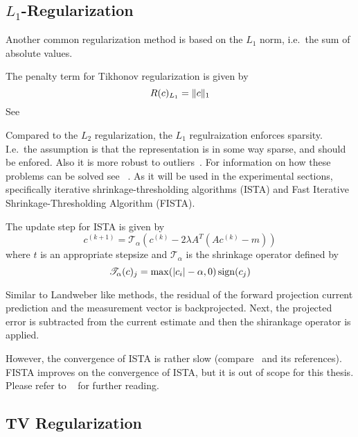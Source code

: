 \subsection{\(L_1\)-Regularization}\label{subsec:l1_regularization}

Another common regularization method is based on the \(L_1\) norm, i.e.\ the sum of absolute
values.
\begin{definition}[\(L_1\)-Regularization]\label{def:l1_regularization}
	The penalty term for Tikhonov regularization is given by
	\[
		R(c)_{L_1} = \lVert c\rVert_1
	\]
	See~\cite{tibshirani_regression_1996,tibshirani_lasso_2013,beck_fast_2009}
\end{definition}
Compared to the \(L_2\) regularization, the \(L_1\) regulraization enforces sparsity. I.e.\ the
assumption is that the representation is in some way sparse, and should be enfored. Also it is
more robust to outliers~\cite{beck_fast_2009}. For information on how these problems can be solved
see \citeauthor{beck_fast_2009}~\cite{beck_fast_2009}. As it will be used in the experimental
sections, specifically iterative shrinkage-thresholding algorithms (ISTA) and  Fast Iterative
Shrinkage-Thresholding Algorithm (FISTA).

\begin{definition}[ISTA]\label{def:ista}
	The update step for ISTA is given by
	\[
            c^{(k+1)} = \mathscr{T_\alpha} (c^{(k)} - 2 \lambda A^T (A c^{(k)} - m))
	\]
        where \(t\) is an appropriate stepsize and \(\mathscr{T_\alpha}\) is the shrinkage operator
        defined by
	\[
            \mathscr{T_\alpha}(c)_j = \max(\lvert c_i\rvert - \alpha, 0) \operatorname{sign}(c_j)
	\]
\end{definition}
Similar to Landweber like methods, the residual of the forward projection current prediction and the
measurement vector is backprojected. Next, the projected error is subtracted from the current
estimate and then the shirankage operator is applied.

However, the convergence of ISTA is rather slow (compare~\cite{beck_fast_2009} and its references).
FISTA improves on the convergence of ISTA, but it is out of scope for this thesis. Please refer to
\citeauthor{beck_fast_2009}~\cite{beck_fast_2009} for further reading. 

\subsection{TV Regularization}\label{subsec:tv_regularization}

%
